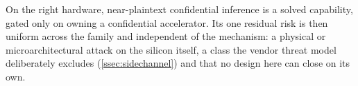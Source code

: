 \begin{keyinsight}
On the right hardware, near-plaintext confidential inference is a solved capability, gated only on
owning a confidential accelerator. Its one residual risk is then uniform across the family and
independent of the mechanism: a physical or microarchitectural attack on the silicon itself, a
class the vendor threat model deliberately excludes (\cref{ssec:sidechannel}) and that no design
here can close on its own.
\end{keyinsight}
